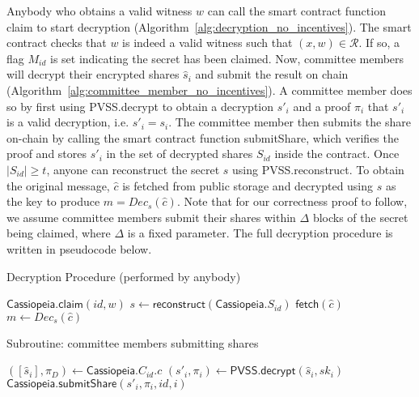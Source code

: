 Anybody who obtains a valid witness $w$ can call the smart contract function \textsf{claim} to start decryption (Algorithm~\ref{alg:decryption_no_incentives}).
The smart contract checks that $w$ is indeed a valid witness such that $(x, w) \in \mathcal{R}$.
If so, a flag $M_{id}$ is set indicating the secret has been claimed.
Now, committee members will decrypt their encrypted shares $\hat{s}_i$ and submit the result on chain (Algorithm~\ref{alg:committee_member_no_incentives}).
A committee member does so by first using \textsf{PVSS.decrypt} to obtain a decryption $s'_i$ and a proof $\pi_i$ that $s'_i$ is a valid decryption, i.e. $s'_i = s_i$.
The committee member then submits the share on-chain by calling the smart contract function \textsf{submitShare}, which verifies the proof and stores $s'_i$ in the set of decrypted shares $S_{id}$ inside the contract.
Once $|S_{id}| \geq t$, anyone can reconstruct the secret $s$ using \textsf{PVSS.reconstruct}.
To obtain the original message, $\hat{c}$ is fetched from public storage and decrypted using $s$ as the key to produce $m = Dec_s(\hat{c})$.
Note that for our correctness proof to follow, we assume committee members submit their shares within $\Delta$ blocks of the secret being claimed, where $\Delta$ is a fixed parameter.
The full decryption procedure is written in pseudocode below.

\begin{algorithm}[h]
    \caption{Decryption Procedure (performed by anybody)}
    \label{alg:decryption_no_incentives}
    \begin{algorithmic}[1]
            \State $\textsf{Cassiopeia.claim}(id, w)$
                \State $s \gets \textsf{reconstruct}(\textsf{Cassiopeia}.S_{id})$
                \State $\textsf{fetch}(\hat{c})$
                \State $m \gets Dec_s(\hat{c})$
            \EndOn
        \EndFunction
    \end{algorithmic}
\end{algorithm}

\begin{algorithm}[h]
    \caption{Subroutine: committee members submitting shares}
\label{alg:committee_member_no_incentives}
    \begin{algorithmic}[1]
            \State $([\hat{s}_i], \pi_D) \gets \textsf{Cassiopeia}.C_{id}.c$
            \State $(s'_i, \pi_i) \gets \textsf{PVSS.decrypt}(\hat{s}_i, sk_i)$
            \State $\textsf{Cassiopeia.submitShare}(s'_i, \pi_i, id, i)$
        \EndOn
    \end{algorithmic}
\end{algorithm}

